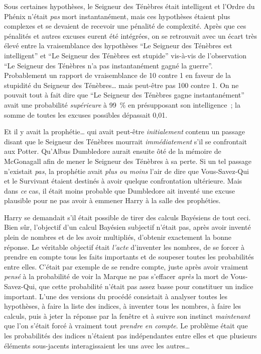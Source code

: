 Sous certaines hypothèses, le Seigneur des Ténèbres était intelligent et l'Ordre du Phénix n'était \emph{pas} mort instantanément, mais ces hypothèses étaient plus complexes et se devaient de recevoir une pénalité de complexité.
Après que ces pénalités et autres excuses eurent été intégrées, on se retrouvait avec un écart très élevé entre la vraisemblance des hypothèses “Le Seigneur des Ténèbres est intelligent” et “Le Seigneur des Ténèbres est stupide” vis-à-vis de l'observation “Le Seigneur des Ténèbres n'a pas instantanément gagné la guerre”.
Probablement un rapport de vraisemblance de 10 contre 1 en faveur de la stupidité du Seigneur des Ténèbres… mais peut-être pas 100 contre 1.
On ne pouvait tout à fait dire que “Le Seigneur des Ténèbres gagne instantanément” avait une probabilité \emph{supérieure} à 99~\% en présupposant son intelligence~; la somme de toutes les excuses possibles dépassait 0,01.

Et il y avait la prophétie… qui avait peut-être \emph{initialement} contenu un passage disant que le Seigneur des Ténèbres mourrait \emph{immédiatement} s'il se confrontait aux Potter.
Qu'Albus Dumbledore aurait ensuite ôté de la mémoire de McGonagall afin de mener le Seigneur des Ténèbres à sa perte.
Si un tel passage n'existait \emph{pas}, la prophétie avait \emph{plus ou moins} l'air de dire que Vous-Savez-Qui et le Survivant étaient destinés à avoir quelque confrontation ultérieure.
Mais dans \emph{ce} cas, il était moins probable que Dumbledore ait inventé une excuse plausible pour ne pas avoir à emmener Harry à la salle des prophéties.

Harry se demandait s'il était possible de tirer des calculs Bayésiens de tout ceci.
Bien sûr, l'objectif d'un calcul Bayésien subjectif n'était pas, après avoir inventé plein de nombres et de les avoir multipliés, d'obtenir exactement la bonne réponse.
Le véritable objectif était \emph{l'acte} d'inventer les nombres, de se forcer à prendre en compte tous les faits importants et de soupeser toutes les probabilités entre elles.
C'était par exemple de se rendre compte, juste après avoir vraiment \emph{pensé} à la probabilité de voir la Marque ne pas s'effacer \emph{après} la mort de Vous-Savez-Qui, que cette probabilité n'était pas assez basse pour constituer un indice important.
L'une des versions du procédé consistait à analyser toutes les hypothèses, à faire la liste des indices, à inventer tous les nombres, à faire les calculs, puis à jeter la réponse par la fenêtre et à suivre son instinct \emph{maintenant} que l'on s'était forcé à vraiment tout \emph{prendre en compte}.
Le problème était que les probabilités des indices n'étaient pas indépendantes entre elles et que plusieurs éléments sous-jacents interagissaient les uns avec les autres…

